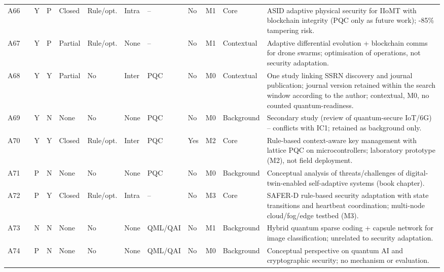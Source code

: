 {\begin{longtable}{p{0.43cm}p{0.8cm}p{0.3cm}p{0.4cm}p{0.8cm}p{0.75cm}p{0.65cm}p{0.8cm}p{0.8cm}p{0.45cm}p{1.1cm}p{4.95cm}}
A66 & \cite{ISLAM2025101653} & Y & P & Closed & Rule/opt. & Intra & -- & No & M1 & Core & ASID adaptive physical security for IIoMT with blockchain integrity (PQC only as future work); -85\% tampering risk. \\
A67 & \cite{ARSHAD2025110487} & Y & P & Partial & Rule/opt. & None & -- & No & M1 & Contextual & Adaptive differential evolution + blockchain comms for drone swarms; optimisation of operations, not security adaptation. \\
A68 & \cite{Li2025_SSRN5325474} & Y & Y & Partial & No & Inter & PQC & No & M0 & Contextual & One study linking SSRN discovery and journal publication; journal version retained within the search window according to the author; contextual, M0, no counted quantum-readiness. \\
A69 & \cite{Karthik_Kumar_Vaigandla_2025} & Y & N & None & No & None & PQC & No & M0 & Background & Secondary study (review of quantum-secure IoT/6G) -- conflicts with IC1; retained as background only. \\
A70 & \cite{Hayouni2025} & Y & Y & Closed & Rule/opt. & Inter & PQC & Yes & M2 & Core & Rule-based context-aware key management with lattice PQC on microcontrollers; laboratory prototype (M2), not field deployment. \\
A71 & \cite{Gunawardhana2025} & P & N & None & No & None & PQC & No & M0 & Background & Conceptual analysis of threats/challenges of digital-twin-enabled self-adaptive systems (book chapter). \\
A72 & \cite{Stadler_2025} & P & Y & Closed & Rule/opt. & Intra & -- & No & M3 & Core & SAFER-D rule-based security adaptation with state transitions and heartbeat coordination; multi-node cloud/fog/edge testbed (M3). \\
A73 & \cite{SHU2026111974} & N & N & None & No & None & QML/QAI & No & M1 & Background & Hybrid quantum sparse coding + capsule network for image classification; unrelated to security adaptation. \\
A74 & \cite{Gencoglu2026} & P & N & None & No & None & QML/QAI & No & M0 & Background & Conceptual perspective on quantum AI and cryptographic security; no mechanism or evaluation. \\
\end{longtable}
\normalsize
}
